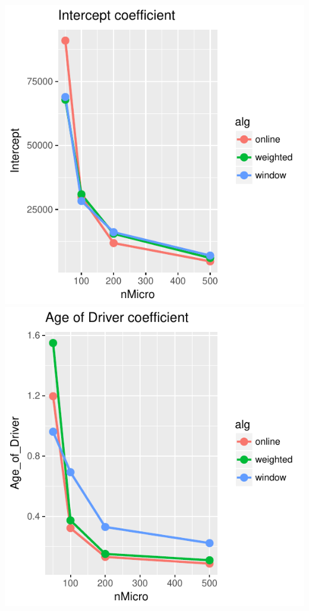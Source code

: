 \includegraphics{offline_regression_files/figure-latex/unnamed-chunk-8-1.pdf}
\includegraphics{offline_regression_files/figure-latex/unnamed-chunk-8-2.pdf}
